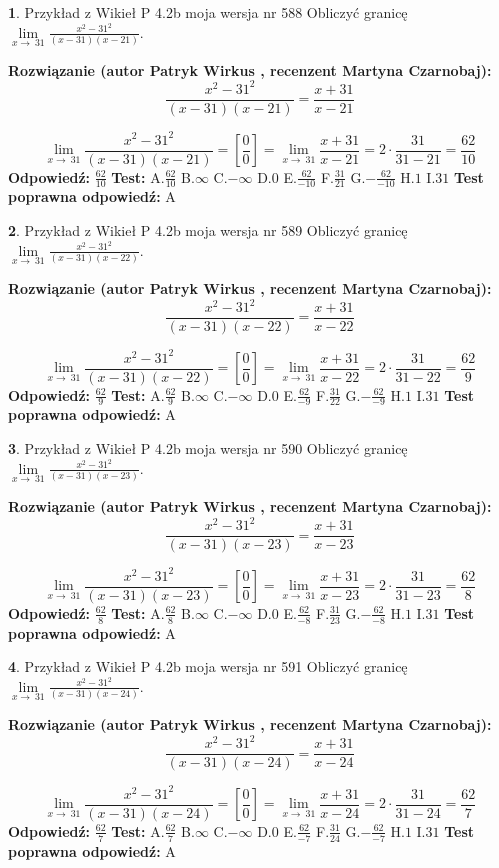 \documentclass[12pt, a4paper]{article}
\theoremstyle{definition} %
\newtheorem{zad}{}
\newcommand{\zadStart}[1]{\begin{zad}#1\newline}
\newcommand{\zadStop}{\end{zad}}
\newcommand{\rozwStart}[2]{\noindent \textbf{Rozwiązanie (autor #1 , recenzent #2): }\newline}
\newcommand{\rozwStop}{\newline}
\newcommand{\odpStart}{\noindent \textbf{Odpowiedź:}\newline}
\newcommand{\odpStop}{\newline}
\newcommand{\testStart}{\noindent \textbf{Test:}\newline}
\newcommand{\testStop}{\newline}
\newcommand{\kluczStart}{\noindent \textbf{Test poprawna odpowiedź:}\newline}
\newcommand{\kluczStop}{\newline}
\begin{document}
\zadStart{Przykład z Wikieł P 4.2b moja wersja nr 588}
Obliczyć granicę $\lim\limits_{x\to\ 31}\frac{x^{2}-31^{2}}{(x-31)(x-21)}$.
\zadStop
\rozwStart{Patryk Wirkus}{Martyna Czarnobaj}
$$\frac{x^{2}-31^{2}}{(x-31)(x-21)}=\frac{x+31}{x-21}$$

$$\lim\limits_{x\to\ 31}\frac{x^{2}-31^{2}}{(x-31)(x-21)}=[\frac{0}{0}]=\lim\limits_{x\to\ 31}\frac{x+31}{x-21}=2 \cdot \frac{31}{31-21} = \frac{62}{10}$$
\rozwStop
\odpStart
$\frac{62}{10}$
\odpStop
\testStart
A.$\frac{62}{10}$
B.$\infty$
C.$-\infty$
D.$0$
E.$\frac{62}{-10}$
F.$\frac{31}{21}$
G.$-\frac{62}{-10}$
H.$1$
I.$31$
\testStop
\kluczStart
A
\kluczStop



\zadStart{Przykład z Wikieł P 4.2b moja wersja nr 589}
Obliczyć granicę $\lim\limits_{x\to\ 31}\frac{x^{2}-31^{2}}{(x-31)(x-22)}$.
\zadStop
\rozwStart{Patryk Wirkus}{Martyna Czarnobaj}
$$\frac{x^{2}-31^{2}}{(x-31)(x-22)}=\frac{x+31}{x-22}$$

$$\lim\limits_{x\to\ 31}\frac{x^{2}-31^{2}}{(x-31)(x-22)}=[\frac{0}{0}]=\lim\limits_{x\to\ 31}\frac{x+31}{x-22}=2 \cdot \frac{31}{31-22} = \frac{62}{9}$$
\rozwStop
\odpStart
$\frac{62}{9}$
\odpStop
\testStart
A.$\frac{62}{9}$
B.$\infty$
C.$-\infty$
D.$0$
E.$\frac{62}{-9}$
F.$\frac{31}{22}$
G.$-\frac{62}{-9}$
H.$1$
I.$31$
\testStop
\kluczStart
A
\kluczStop



\zadStart{Przykład z Wikieł P 4.2b moja wersja nr 590}
Obliczyć granicę $\lim\limits_{x\to\ 31}\frac{x^{2}-31^{2}}{(x-31)(x-23)}$.
\zadStop
\rozwStart{Patryk Wirkus}{Martyna Czarnobaj}
$$\frac{x^{2}-31^{2}}{(x-31)(x-23)}=\frac{x+31}{x-23}$$

$$\lim\limits_{x\to\ 31}\frac{x^{2}-31^{2}}{(x-31)(x-23)}=[\frac{0}{0}]=\lim\limits_{x\to\ 31}\frac{x+31}{x-23}=2 \cdot \frac{31}{31-23} = \frac{62}{8}$$
\rozwStop
\odpStart
$\frac{62}{8}$
\odpStop
\testStart
A.$\frac{62}{8}$
B.$\infty$
C.$-\infty$
D.$0$
E.$\frac{62}{-8}$
F.$\frac{31}{23}$
G.$-\frac{62}{-8}$
H.$1$
I.$31$
\testStop
\kluczStart
A
\kluczStop



\zadStart{Przykład z Wikieł P 4.2b moja wersja nr 591}
Obliczyć granicę $\lim\limits_{x\to\ 31}\frac{x^{2}-31^{2}}{(x-31)(x-24)}$.
\zadStop
\rozwStart{Patryk Wirkus}{Martyna Czarnobaj}
$$\frac{x^{2}-31^{2}}{(x-31)(x-24)}=\frac{x+31}{x-24}$$

$$\lim\limits_{x\to\ 31}\frac{x^{2}-31^{2}}{(x-31)(x-24)}=[\frac{0}{0}]=\lim\limits_{x\to\ 31}\frac{x+31}{x-24}=2 \cdot \frac{31}{31-24} = \frac{62}{7}$$
\rozwStop
\odpStart
$\frac{62}{7}$
\odpStop
\testStart
A.$\frac{62}{7}$
B.$\infty$
C.$-\infty$
D.$0$
E.$\frac{62}{-7}$
F.$\frac{31}{24}$
G.$-\frac{62}{-7}$
H.$1$
I.$31$
\testStop
\kluczStart
A
\kluczStop
\end{document}
